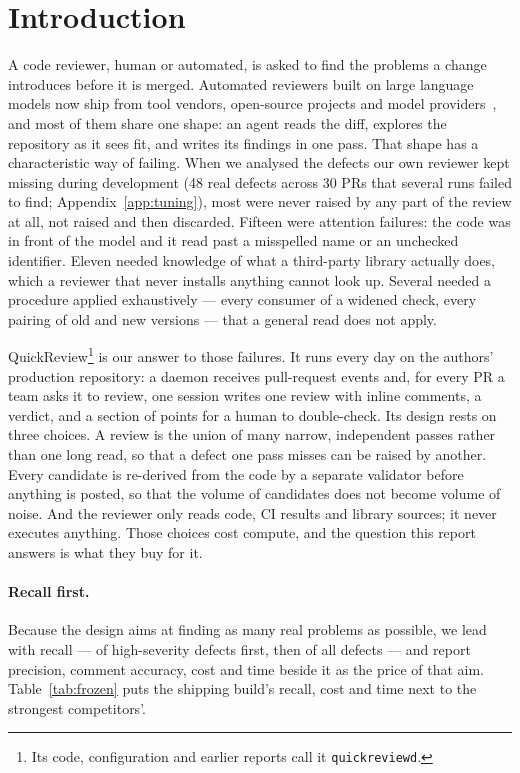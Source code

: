 \documentclass[11pt,a4paper]{article}
\newcommand{\code}[1]{\texttt{#1}}
\begin{document}
\tableofcontents
\clearpage

\section{Introduction}
\label{sec:intro}

A code reviewer, human or automated, is asked to find the problems a change
introduces before it is merged. Automated reviewers built on large language
models now ship from tool vendors, open-source projects and model
providers~\cite{codex,claudecode,ocr,pragent,pireview,opencode}, and most of
them share one shape: an agent reads the diff, explores the repository as
it sees fit, and writes its findings in one pass. That shape has a
characteristic way of failing. When we analysed the defects our own
reviewer kept missing during development (48 real defects across 30 PRs
that several runs failed to find;
Appendix~\ref{app:tuning}), most were never raised by any part of the
review at all, not raised and then discarded. Fifteen were attention
failures: the code was in front of the model and it read past a misspelled
name or an unchecked identifier. Eleven needed knowledge of what a
third-party library actually does, which a reviewer that never installs
anything cannot look up. Several needed a procedure applied exhaustively ---
every consumer of a widened check, every pairing of old and new versions
--- that a general read does not apply.

QuickReview\footnote{Its code, configuration and earlier reports call it
\code{quickreviewd}.} is our answer to those failures. It runs every day on
the authors' production repository: a daemon receives pull-request events and,
for every PR a team asks it to review, one session writes one review with
inline comments, a verdict, and a section of points for a human to
double-check. Its design rests on three choices. A review is the union of
many narrow, independent passes rather than one long read, so that a defect
one pass misses can be raised by another. Every candidate is re-derived from
the code by a separate validator before anything is posted, so that the
volume of candidates does not become volume of noise. And the reviewer only
reads code, CI results and library sources; it never executes anything.
Those choices cost compute, and the question this report answers is what
they buy for it.

\paragraph{Recall first.} Because the design aims at finding as many real
problems as possible, we lead with recall --- of high-severity defects
first, then of all defects --- and report precision, comment accuracy, cost
and time beside it as the price of that aim. Table~\ref{tab:frozen} puts the
shipping build's recall, cost and time next to the strongest competitors'.
\end{document}
